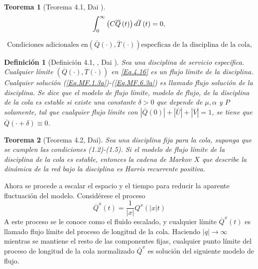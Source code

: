 \documentclass{article}
\newtheorem{Def}{Definición}[section]
\newtheorem{Teo}{Teorema}[section]
\numberwithin{equation}{section}
\begin{document}
\begin{Teo}[Teorema 4.1, Dai \cite{Dai}]
\begin{equation}\label{Eq.MF.5.3a}
\int_{0}^{\infty}\left(C\overline{Q}\left(t\right)\right)d\overline{I}\left(t\right)=0,\\
\end{equation}

\begin{equation}\label{Eq.MF.6.3a}
\textrm{Condiciones adicionales en
}\left(\overline{Q}\left(\cdot\right),\overline{T}\left(\cdot\right)\right)\textrm{
especficas de la disciplina de la cola,}
\end{equation}
\end{Teo}

\begin{Def}[Definici\'on 4.1, , Dai \cite{Dai}]
Sea una disciplina de servicio espec\'ifica. Cualquier l\'imite
$\left(\overline{Q}\left(\cdot\right),\overline{T}\left(\cdot\right)\right)$
en \ref{Eq.4.16} es un {\em flujo l\'imite} de la disciplina.
Cualquier soluci\'on (\ref{Eq.MF.1.3a})-(\ref{Eq.MF.6.3a}) es
llamado flujo soluci\'on de la disciplina. Se dice que el modelo de flujo l\'imite, modelo de flujo, de la disciplina de la cola es estable si existe una constante
$\delta>0$ que depende de $\mu,\alpha$ y $P$ solamente, tal que
cualquier flujo l\'imite con
$|\overline{Q}\left(0\right)|+|\overline{U}|+|\overline{V}|=1$, se
tiene que $\overline{Q}\left(\cdot+\delta\right)\equiv0$.
\end{Def}

\begin{Teo}[Teorema 4.2, Dai\cite{Dai}]\label{Tma.4.2.Dai}
Sea una disciplina fija para la cola, suponga que se cumplen las
condiciones (1.2)-(1.5). Si el modelo de flujo l\'imite de la
disciplina de la cola es estable, entonces la cadena de Markov $X$
que describe la din\'amica de la red bajo la disciplina es Harris
recurrente positiva.
\end{Teo}

Ahora se procede a escalar el espacio y el tiempo para reducir la
aparente fluctuaci\'on del modelo. Consid\'erese el proceso
\begin{equation}\label{Eq.3.7}
\overline{Q}^{x}\left(t\right)=\frac{1}{|x|}Q^{x}\left(|x|t\right)
\end{equation}
A este proceso se le conoce como el fluido escalado, y cualquier l\'imite $\overline{Q}^{x}\left(t\right)$ es llamado flujo l\'imite del proceso de longitud de la cola. Haciendo $|q|\rightarrow\infty$ mientras se mantiene el resto de las componentes fijas, cualquier punto l\'imite del proceso de longitud de la cola normalizado $\overline{Q}^{x}$ es soluci\'on del siguiente modelo de flujo.
\end{document}
